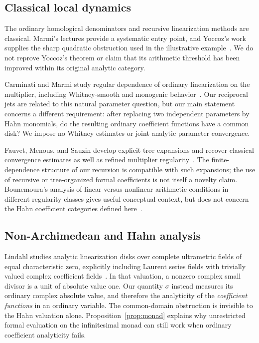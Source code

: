 \documentclass[11pt,a4paper]{article}
\numberwithin{equation}{section}
\theoremstyle{definition}
\theoremstyle{remark}
\begin{document}
\subsection{Classical local dynamics}

The ordinary homological denominators and recursive linearization methods
are classical. Marmi's lectures provide a systematic entry point, and
Yoccoz's work supplies the sharp quadratic obstruction used in the
illustrative example~\cite{Marmi,Yoccoz}. We do not reprove Yoccoz's theorem
or claim that its arithmetic threshold has been improved within its
original analytic category.

Carminati and Marmi study regular dependence of ordinary linearization on
the multiplier, including Whitney-smooth and monogenic
behavior~\cite{CarminatiMarmi}. Our reciprocal jets are related to this
natural parameter question, but our main statement concerns a different
requirement: after replacing two independent parameters by Hahn monomials,
do the resulting ordinary coefficient functions have a common disk? We
impose no Whitney estimates or joint analytic parameter convergence.

Fauvet, Menous, and Sauzin develop explicit tree expansions and recover
classical convergence estimates as well as refined multiplier
regularity~\cite{FauvetMenousSauzin}. The finite-dependence structure of our
recursion is compatible with such expansions; the use of recursive or
tree-organized formal coefficients is not itself a novelty claim.
Bounemoura's analysis of linear versus nonlinear arithmetic conditions
in different regularity classes gives useful conceptual context, but does
not concern the Hahn coefficient categories defined here~\cite{Bounemoura}.

\subsection{Non-Archimedean and Hahn analysis}

Lindahl studies analytic linearization disks over complete ultrametric
fields of equal characteristic zero, explicitly including Laurent series
fields with trivially valued complex coefficient fields~\cite{Lindahl}.
In that valuation, a nonzero complex small divisor is a unit of absolute
value one. Our quantity $\sigma$ instead measures its ordinary complex
absolute value, and therefore the analyticity of the \emph{coefficient
functions} in an ordinary variable. The common-domain obstruction is
invisible to the Hahn valuation alone. Proposition~\ref{prop:monad}
explains why unrestricted formal evaluation on the infinitesimal monad can
still work when ordinary coefficient analyticity fails.
\end{document}

